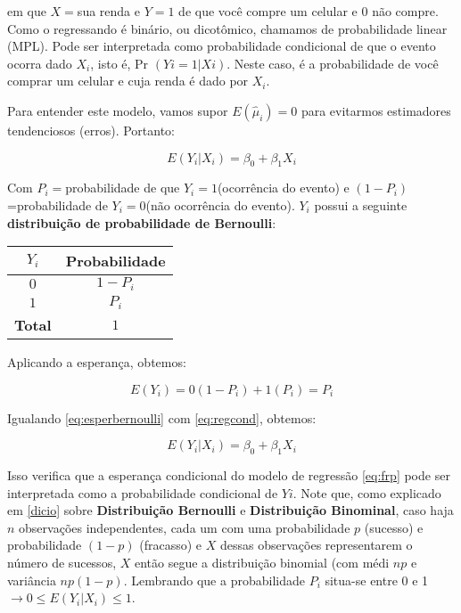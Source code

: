 \documentclass[
]{book}
\begin{document}
em que \(X =\)sua renda e \(Y=1\) de que você compre um celular e \(0\) não compre. Como o regressando é binário, ou dicotômico, chamamos de probabilidade linear (MPL). Pode ser interpretada como probabilidade condicional de que o evento ocorra dado \(X_i\), isto é, Pr \((Yi = 1 | Xi)\). Neste caso, é a probabilidade de você comprar um celular e cuja renda é dado por \(X_i\).

Para entender este modelo, vamos supor \(E(\hat{\mu}_i)=0\) para evitarmos estimadores tendenciosos (erros). Portanto:

\begin{equation}
    E(Y_i|X_i)=\beta_0+\beta_1 X_i
    \label{eq:regcond}
\end{equation}

Com \(P_i=\)probabilidade de que \(Y_i=1\)(ocorrência do evento) e \((1-P_i)\)=probabilidade de \(Y_i=0\)(não ocorrência do evento). \(Y_i\) possui a seguinte \textbf{distribuição de probabilidade de Bernoulli}:

\begin{longtable}[]{@{}cc@{}}
\toprule
\textbf{\(Y_i\)} & \textbf{Probabilidade}\tabularnewline
\midrule
\endhead
\(0\) & \(1-P_i\)\tabularnewline
\(1\) & \(P_i\)\tabularnewline
\textbf{Total} & \(1\)\tabularnewline
\bottomrule
\end{longtable}

Aplicando a esperança, obtemos:

\begin{equation}
    E(Y_i)=0(1-P_i)+1(P_i)=P_i
    \label{eq:esperbernoulli}
\end{equation}

Igualando \eqref{eq:esperbernoulli} com \eqref{eq:regcond}, obtemos:

\begin{equation}
    E(Y_i|X_i)=\beta_0+\beta_1 X_i
    \label{eq:regprob}
\end{equation}

Isso verifica que a esperança condicional do modelo de regressão \eqref{eq:frp} pode ser interpretada como a probabilidade
condicional de \(Yi\). Note que, como explicado em \ref{dicio} sobre \textbf{Distribuição Bernoulli} e \textbf{Distribuição Binominal}, caso haja \(n\) observações independentes, cada um com uma probabilidade \(p\) (sucesso) e probabilidade \((1 - p)\) (fracasso) e \(X\) dessas observações representarem o número de sucessos, \(X\) então segue a distribuição binomial (com médi \(np\) e variância \(np(1-p)\). Lembrando que a probabilidade \(P_i\) situa-se entre 0 e 1 \(\rightarrow 0 \leq E(Y_i|X_i) \leq 1\).
\end{document}
